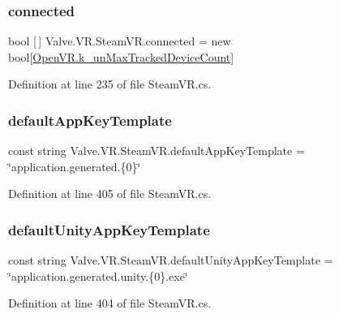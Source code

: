 \subsubsection{\texorpdfstring{connected}{connected}}
{\footnotesize\ttfamily bool \mbox{[}$\,$\mbox{]} Valve.\+V\+R.\+Steam\+V\+R.\+connected = new bool\mbox{[}\mbox{\hyperlink{class_valve_1_1_v_r_1_1_open_v_r_aec52ee031bff706f1b96c7f2c8ebc0ac}{Open\+V\+R.\+k\+\_\+un\+Max\+Tracked\+Device\+Count}}\mbox{]}\hspace{0.3cm}{\ttfamily [static]}}



Definition at line 235 of file Steam\+V\+R.\+cs.

\mbox{\label{class_valve_1_1_v_r_1_1_steam_v_r_a90671d13e29563cc9e9ba27055566cd6}} 
\subsubsection{\texorpdfstring{defaultAppKeyTemplate}{defaultAppKeyTemplate}}
{\footnotesize\ttfamily const string Valve.\+V\+R.\+Steam\+V\+R.\+default\+App\+Key\+Template = \char`\"{}application.\+generated.\{0\}\char`\"{}}



Definition at line 405 of file Steam\+V\+R.\+cs.

\mbox{\label{class_valve_1_1_v_r_1_1_steam_v_r_ab14fecc8ada6097d491ec89532dc2edf}} 
\subsubsection{\texorpdfstring{defaultUnityAppKeyTemplate}{defaultUnityAppKeyTemplate}}
{\footnotesize\ttfamily const string Valve.\+V\+R.\+Steam\+V\+R.\+default\+Unity\+App\+Key\+Template = \char`\"{}application.\+generated.\+unity.\{0\}.exe\char`\"{}}



Definition at line 404 of file Steam\+V\+R.\+cs.

\mbox{\label{class_valve_1_1_v_r_1_1_steam_v_r_aebdf879d97763960970090cfff20a8a7}} 
